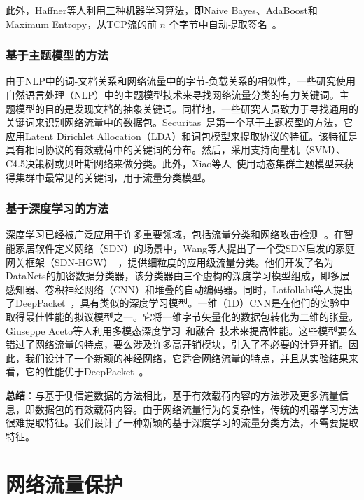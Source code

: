 \documentclass[degree=master,cjk-font=noto]{thuthesis}
\begin{document}
此外，Haffner等人利用三种机器学习算法，即Naive Bayes、AdaBoost和Maximum Entropy，从TCP流的前 $n$ 个字节中自动提取签名~\cite{b19}。

\subsubsection{基于主题模型的方法}

由于NLP中的词-文档关系和网络流量中的字节-负载关系的相似性，一些研究使用自然语言处理（NLP）中的主题模型技术来寻找网络流量分类的有力关键词。主题模型的目的是发现文档的抽象关键词。同样地，一些研究人员致力于寻找通用的关键词来识别网络流量中的数据包。Securitas~\cite{b25}是第一个基于主题模型的方法，它应用Latent Dirichlet Allocation（LDA）和词包模型来提取协议的特征。该特征是具有相同协议的有效载荷中的关键词的分布。然后，采用支持向量机（SVM）、C4.5决策树或贝叶斯网络来做分类。此外，Xiao等人~\cite{DMTCS}使用动态集群主题模型来获得集群中最常见的关键词，用于流量分类模型。

\subsubsection{基于深度学习的方法}

深度学习已经被广泛应用于许多重要领域，包括流量分类和网络攻击检测~\cite{iot_attack_detection}。在智能家居软件定义网络（SDN）的场景中，Wang等人提出了一个受SDN启发的家庭网关框架（SDN-HGW）~\cite{SDN_HGW}，提供细粒度的应用级流量分类。他们开发了名为DataNets的加密数据分类器，该分类器由三个虚构的深度学习模型组成，即多层感知器、卷积神经网络（CNN）和堆叠的自动编码器。同时，Lotfollahi等人提出了DeepPacket~\cite{deep_packet}，具有类似的深度学习模型。一维（1D）CNN是在他们的实验中取得最佳性能的拟议模型之一。它将一维字节矢量化的数据包转化为二维的张量。Giuseppe Aceto等人利用多模态深度学习~\cite{MIMETIC}和融合~\cite{mobile_app_class}技术来提高性能。这些模型要么错过了网络流量的特点，要么涉及许多高开销模块，引入了不必要的计算开销。因此，我们设计了一个新颖的神经网络，它适合网络流量的特点，并且从实验结果来看，它的性能优于DeepPacket~\cite{deep_packet}。

\textbf{总结}：与基于侧信道数据的方法相比，基于有效载荷内容的方法涉及更多流量信息，即数据包的有效载荷内容。由于网络流量行为的复杂性，传统的机器学习方法很难提取特征。我们设计了一种新颖的基于深度学习的流量分类方法，不需要提取特征。

\section{网络流量保护}
\end{document}
